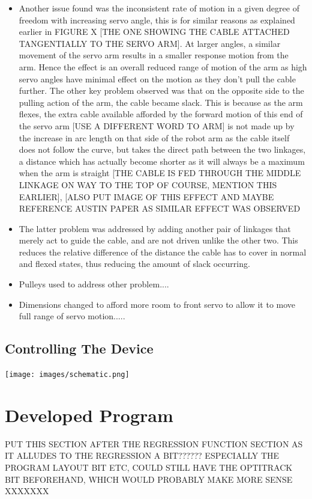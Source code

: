 \documentclass[11pt]{article}
\begin{document}
\begin{itemize}
\item{Another issue found was the inconsistent rate of motion in a given degree of freedom with increasing servo angle, this is for similar reasons as explained earlier in FIGURE X [THE ONE SHOWING THE CABLE ATTACHED TANGENTIALLY TO THE SERVO ARM]. At larger angles, a similar movement of the servo arm results in a smaller response motion from the arm. Hence the effect is an overall reduced range of motion of the arm as high servo angles have minimal effect on the motion as they don't pull the cable further. The other key problem observed was that on the opposite side to the pulling action of the arm, the cable became slack. This is because as the arm flexes, the extra cable available afforded by the forward motion of this end of the servo arm [USE A DIFFERENT WORD TO ARM] is not made up by the increase in arc length on that side of the robot arm  as the cable itself does not follow the curve, but takes the  direct path between the two linkages, a distance which has actually become shorter as it will always be a maximum when the arm is straight [THE CABLE IS FED THROUGH THE MIDDLE LINKAGE ON WAY TO THE TOP OF COURSE, MENTION THIS EARLIER], [ALSO PUT IMAGE OF THIS EFFECT AND MAYBE REFERENCE AUSTIN PAPER AS SIMILAR EFFECT WAS OBSERVED}
\item{The latter problem was addressed by adding another pair of linkages that merely act to guide the cable, and are not driven unlike the other two. This reduces the relative difference of the distance the cable has to cover in normal and flexed states, thus reducing the amount of slack occurring.}
\item{Pulleys used to address other problem....}
\item{Dimensions changed to afford more room to front servo to allow it to move full range of servo motion.....} 
\end{itemize}

\subsection{Controlling The Device}

\begin{center}
\texttt{[image: images/schematic.png]}
\label{figure:schematic}
\end{center}

\pagebreak
\section{Developed Program}
PUT THIS SECTION AFTER THE REGRESSION FUNCTION SECTION AS IT ALLUDES TO THE REGRESSION A BIT?????? ESPECIALLY THE PROGRAM LAYOUT BIT ETC, COULD STILL HAVE THE OPTITRACK BIT BEFOREHAND, WHICH WOULD PROBABLY MAKE MORE SENSE XXXXXXX
\end{document}
